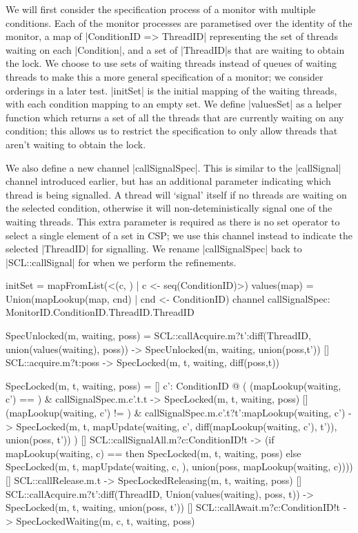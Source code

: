   We will first consider the specification process of a monitor with multiple conditions. Each of the monitor processes are parametised over the identity of the monitor, a map of |ConditionID => {ThreadID}| representing the set of threads waiting on each |Condition|, and a set of |ThreadID|s that are waiting to obtain the lock. We choose to use sets of waiting threads instead of queues of waiting threads to make this a more general specification of a monitor; we consider orderings in a later test. |initSet| is the initial mapping of the waiting threads, with each condition mapping to an empty set. We define |valuesSet| as a helper function which returns a set of all the threads that are currently waiting on any condition; this allows us to restrict the specification to only allow threads that aren't waiting to obtain the lock. 
  
  We also define a new channel |callSignalSpec|. This is similar to the |callSignal| channel introduced earlier, but has an additional parameter indicating which thread is being signalled. A thread will `signal' itself if no threads are waiting on the selected condition, otherwise it will non-deteministically signal one of the waiting threads. This extra parameter is required as there is no set operator to select a single element of a set in CSP; we use this channel instead to indicate the selected |ThreadID| for signalling. We rename |callSignalSpec| back to |SCL::callSignal| for when we perform the refinements.

  \begin{cspm}
initSet = mapFromList(<(c, {}) | c <- seq(ConditionID)>)
values(map) = Union({mapLookup(map, cnd) | cnd <- ConditionID})
channel callSignalSpec: MonitorID.ConditionID.ThreadID.ThreadID

SpecUnlocked(m, waiting, poss) =
     SCL::callAcquire.m?t':diff(ThreadID, union(values(waiting), poss)) ->
       SpecUnlocked(m, waiting, union(poss,{t'}))
  [] SCL::acquire.m?t:poss -> SpecLocked(m, t, waiting, diff(poss,{t}))
      

SpecLocked(m, t, waiting, poss) =
  [] c': ConditionID @  
      (   
          (mapLookup(waiting, c') == {}) & callSignalSpec.m.c'.t.t ->
             SpecLocked(m, t, waiting, poss)
       [] (mapLookup(waiting, c') != {}) & 
            callSignalSpec.m.c'.t?t':mapLookup(waiting, c') -> 
              SpecLocked(m, t, 
                        mapUpdate(waiting, c', diff(mapLookup(waiting, c'), {t'})), 
                        union(poss, {t'}))
      )
  [] SCL::callSignalAll.m?c:ConditionID!t -> 
       (if mapLookup(waiting, c) == {} then 
            SpecLocked(m, t, waiting, poss) 
        else SpecLocked(m, t, mapUpdate(waiting, c, {}), 
                          union(poss, mapLookup(waiting, c))))
  [] SCL::callRelease.m.t -> 
        SpecLockedReleasing(m, t, waiting, poss)
  [] SCL::callAcquire.m?t':diff(ThreadID, 
                                Union({values(waiting), poss, {t}})) -> 
        SpecLocked(m, t, waiting, union(poss, {t'}))
  [] SCL::callAwait.m?c:ConditionID!t -> 
        SpecLockedWaiting(m, c, t, waiting, poss)
  \end{cspm}

